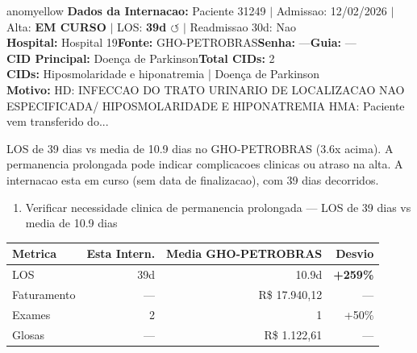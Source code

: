 \documentclass[a4paper,10pt]{article}
\begin{document}
\begin{anomalycard}[Internacao 166024 | GHO-PETROBRAS | MODERADO (z=2.03)]{anomyellow}
\textbf{Dados da Internacao:} Paciente 31249 $\mid$ Admissao: 12/02/2026 $\mid$ Alta: \textcolor{anomorange}{\textbf{EM CURSO}} $\mid$ LOS: \textbf{39d \textcolor{anomorange}{$\circlearrowleft$}} $\mid$ Readmissao 30d: Nao\\
\textbf{Hospital:} Hospital 19\quad\textbf{Fonte:} GHO-PETROBRAS\quad\textbf{Senha:} ---\quad\textbf{Guia:} ---\\
\textbf{CID Principal:} {\small Doença de Parkinson}\quad\textbf{Total CIDs:} 2\\

\textbf{CIDs:} {\scriptsize Hiposmolaridade e hiponatremia | Doença de Parkinson}\\

\textbf{Motivo:} {\scriptsize HD: INFECCAO DO TRATO URINARIO DE LOCALIZACAO NAO ESPECIFICADA/ HIPOSMOLARIDADE E HIPONATREMIA  HMA: Paciente vem transferido do...}\\

\vspace{2pt}\begin{tcolorbox}[colback=severityred!20,colframe=anomyellow,title={\textbf{Interpretacao de Negocio}},fonttitle=\bfseries\small,left=4pt,right=4pt,top=3pt,bottom=3pt]
{\small LOS de 39 dias vs media de 10.9 dias no GHO-PETROBRAS (3.6x acima). A permanencia prolongada pode indicar complicacoes clinicas ou atraso na alta. A internacao esta em curso (sem data de finalizacao), com 39 dias decorridos.}
\end{tcolorbox}
\begin{tcolorbox}[colback=severityyellow!30,colframe=anomorange,title={\textbf{Recomendacoes Especificas}},fonttitle=\bfseries\small,left=4pt,right=4pt,top=3pt,bottom=3pt]
\begin{enumerate}[nosep,leftmargin=16pt]
\item {\small Verificar necessidade clinica de permanencia prolongada --- LOS de 39 dias vs media de 10.9 dias}
\end{enumerate}
\end{tcolorbox}
\begin{center}\begin{tabular}{l r r r}\toprule\textbf{Metrica} & \textbf{Esta Intern.} & \textbf{Media GHO-PETROBRAS} & \textbf{Desvio} \\\midrule
LOS & 39d & 10.9d & \textcolor{anomred}{\textbf{+259\%}} \\
Faturamento & --- & R\$ 17.940,12 & --- \\
Exames & 2 & 1 & \textcolor{anomorange}{+50\%} \\
Glosas & --- & R\$ 1.122,61 & --- \\
\bottomrule\end{tabular}\end{center}


\end{anomalycard}
\end{document}
